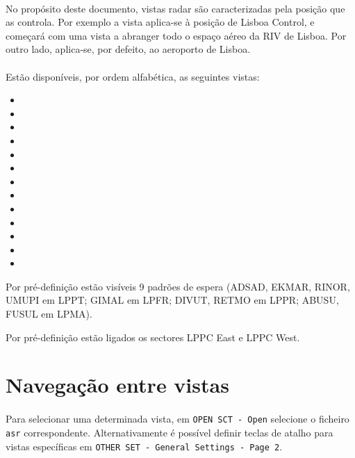 \documentclass[10pt]{report}
\begin{document}
\paragraph*{} No propósito deste documento, vistas radar são caracterizadas pela posição que as
controla. Por exemplo a vista  aplica-se à posição de Lisboa Control, e começará com
uma vista a abranger todo o espaço aéreo da RIV de Lisboa. Por outro lado, 
aplica-se, por defeito, ao aeroporto de Lisboa.

\paragraph*{} Estão disponíveis, por ordem alfabética, as seguintes vistas:
\begin{itemize}
    \item {}
    \item {}
    \item {}
    \item {}
    \item {}
    \item {}
    \item {}
    \item {}
    \item {}
    \item {}
    \item {}
    \item {}
    \item {}
\end{itemize}

Por pré-definição estão visíveis 9 padrões de espera (ADSAD, EKMAR, RINOR, UMUPI em LPPT;
GIMAL em LPFR; DIVUT, RETMO em LPPR; ABUSU, FUSUL em LPMA).

Por pré-definição estão ligados os sectores LPPC East e LPPC West.

\section{Navegação entre vistas}

\paragraph*{} Para selecionar uma determinada vista, em \texttt{OPEN SCT - Open} selecione o ficheiro
\texttt{asr} correspondente. Alternativamente é possível definir teclas de atalho para vistas
específicas em \texttt{OTHER SET - General Settings - Page 2}.
\end{document}
